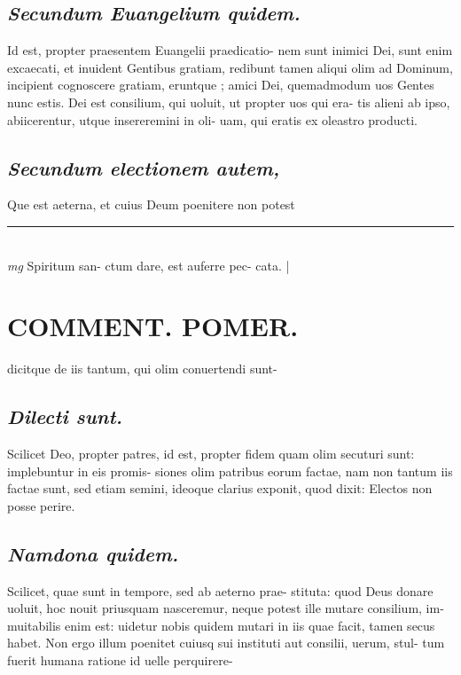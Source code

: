 \documentclass{article}
\begin{document}
\begin{pages}
\subsection*{\textit{Secundum Euangelium quidem. }}\pstart Id est, propter praesentem Euangelii praedicatio- nem sunt inimici Dei, sunt enim excaecati, et inuident Gentibus gratiam, redibunt tamen aliqui olim ad Dominum, incipient cognoscere gratiam, eruntque ; amici Dei, quemadmodum uos Gentes nunc estis. Dei est consilium, qui uoluit, ut propter uos qui era- tis alieni ab ipso, abiicerentur, utque insereremini in oli- uam, qui eratis ex oleastro producti.  \pend
{}
{}
\subsection*{\textit{Secundum electionem autem, }}\pstart Que est aeterna, et cuius Deum poenitere non potest  \pend
\vspace{0.5cm}\noindent
\vspace{0.2cm}\rule{1cm}{0.2pt}\\ 
\hspace{0.2cm}\textit{mg}
\footnotesize Spiritum san- ctum dare, est auferre pec- cata.  
\normalsize| 
\section*{COMMENT. POMER.  }\pstart dicitque de iis tantum, qui olim conuertendi sunt-  \pend
{}
{}
\subsection*{\textit{Dilecti sunt. }}\pstart Scilicet Deo, propter patres, id est, propter fidem quam olim secuturi sunt: implebuntur in eis promis- siones olim patribus eorum factae, nam non tantum iis factae sunt, sed etiam semini, ideoque clarius exponit, quod dixit: Electos non posse perire.   \pend
{}
{}
\subsection*{\textit{Namdona quidem. }}\pstart Scilicet, quae sunt in tempore, sed ab aeterno prae- stituta: quod Deus donare uoluit, hoc nouit priusquam nasceremur, neque potest ille mutare consilium, im- muitabilis enim est: uidetur nobis quidem mutari in iis quae facit, tamen secus habet. Non ergo illum poenitet cuiusq sui instituti aut consilii, uerum, stul- tum fuerit humana ratione id uelle perquirere-  \pend
{}
{}

\end{pages}
\end{document}
